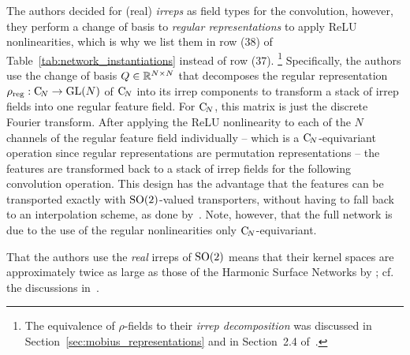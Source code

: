 The authors decided for (real) \emph{irreps} as field types for the convolution, however, they perform a change of basis to \emph{regular representations} to apply ReLU nonlinearities, which is why we list them in row (38) of Table~\ref{tab:network_instantiations} instead of row (37).%
\footnote{
    The equivalence of $\rho$-fields to their \emph{irrep decomposition} was discussed in Section~\ref{sec:mobius_representations} and in Section~2.4 of~\cite{Weiler2019_E2CNN}.
}
Specifically, the authors use the change of basis $Q\in\mathbb{R}^{N\times N}$ that decomposes the regular representation $\rho_{\textup{reg}}: \operatorname{C}_{\!N} \to \operatorname{GL}(N)$ of $\operatorname{C}_{\!N}$ into its irrep components to transform a stack of irrep fields into one regular feature field.
For $\operatorname{C}_{\!N}$, this matrix is just the discrete Fourier transform.
After applying the ReLU nonlinearity to each of the $N$ channels of the regular feature field individually -- which is a $\operatorname{C}_{\!N}$-equivariant operation since regular representations are permutation representations -- the features are transformed back to a stack of irrep fields for the following convolution operation.
This design has the advantage that the features can be transported exactly with $\operatorname{SO}(2)$-valued transporters, without having to fall back to an interpolation scheme, as done by~\citet{poulenard2018multi}.
Note, however, that the full network is due to the use of the regular nonlinearities only $\operatorname{C}_{\!N}$-equivariant.

That the authors use the \emph{real} irreps of $\operatorname{SO}(2)$ means that their kernel spaces are approximately twice as large as those of the Harmonic Surface Networks by \citet{Wiersma2020}; cf. the discussions in~\cite{Weiler2019_E2CNN,lang2020WignerEckart}.



